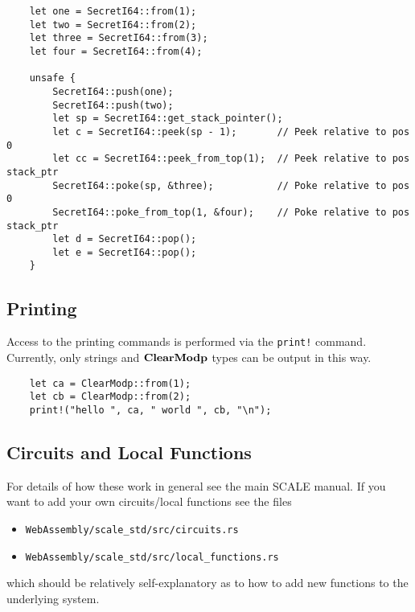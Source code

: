\begin{lstlisting}
    let one = SecretI64::from(1);
    let two = SecretI64::from(2);
    let three = SecretI64::from(3);
    let four = SecretI64::from(4);

    unsafe {
        SecretI64::push(one);
        SecretI64::push(two);
        let sp = SecretI64::get_stack_pointer();
        let c = SecretI64::peek(sp - 1);       // Peek relative to pos 0
        let cc = SecretI64::peek_from_top(1);  // Peek relative to pos stack_ptr
        SecretI64::poke(sp, &three);           // Poke relative to pos 0
        SecretI64::poke_from_top(1, &four);    // Poke relative to pos stack_ptr
        let d = SecretI64::pop();
        let e = SecretI64::pop();
    }
\end{lstlisting}

\subsection{Printing}
Access to the printing commands is performed via the
\verb|print!| command. 
Currently, only strings and $\mathbf{ClearModp}$ types can be output in this way.
\begin{lstlisting}
    let ca = ClearModp::from(1);
    let cb = ClearModp::from(2);
    print!("hello ", ca, " world ", cb, "\n");
\end{lstlisting}


\subsection{Circuits and Local Functions}
For details of how these work in general see the main SCALE manual.
If you want to add your own circuits/local functions see the
files
\begin{itemize}
\item \verb|WebAssembly/scale_std/src/circuits.rs|
\item \verb|WebAssembly/scale_std/src/local_functions.rs|
\end{itemize}
which should be relatively self-explanatory as to how to add
new functions to the underlying system.

